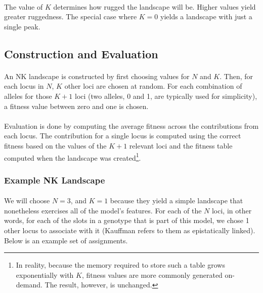 \documentclass[12pt,letterpaper,titlepage]{article}
\begin{document}
\paragraph{}
The value of $K$ determines how rugged the landscape will be. Higher values
yield greater ruggedness. The special case where $K=0$ yields a landscape with
just a single peak.

\subsection{Construction and Evaluation}

\paragraph{}
An NK landscape is constructed by first choosing values for $N$ and $K$. Then,
for each locus in $N$, $K$ other loci are chosen at random. For each
combination of alleles for those $K+1$ loci (two alleles, 0 and 1, are
typically used for simplicity), a fitness value between zero and one is chosen.

\paragraph{}
Evaluation is done by computing the average fitness across the contributions
from each locus. The contribution for a single locus is computed using the
correct fitness based on the values of the $K+1$ relevant loci and the fitness
table computed when the landscape was created\footnote{In reality, because the
memory required to store such a table grows exponentially with $K$, fitness
values are more commonly generated on-demand. The result, however, is
unchanged.}.

\subsubsection{Example NK Landscape}

\paragraph{}
We will choose $N=3$, and $K=1$ because they yield a simple landscape that
nonetheless exercises all of the model's features. For each of the $N$ loci, in
other words, for each of the slots in a genotype that is part of this model, we
chose 1 other locus to associate with it (Kauffman refers to them as
epistatically linked). Below is an example set of assignments.
\end{document}
